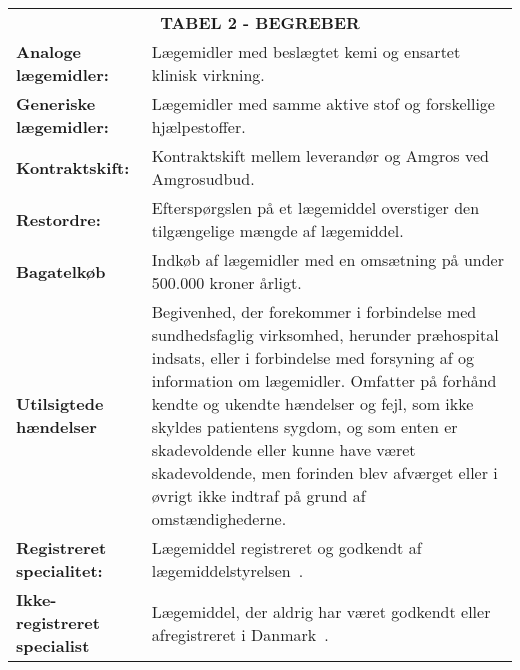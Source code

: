 \begin{table}[H]
\label{table:begreber}
\begin{tabular}{p{4.5cm} p{9.8cm}}
\multicolumn{2}{c}{\cellcolor[HTML]{C0C0C0}\textbf{TABEL 2 - BEGREBER}} \vspace{0.5cm}\\
\textbf{Analoge lægemidler:} & Lægemidler med beslægtet kemi og ensartet klinisk virkning. \vspace{0.5cm} \\
\textbf{Generiske lægemidler:} & Lægemidler med samme aktive stof og forskellige hjælpestoffer.\vspace{0.5cm} \\
\textbf{Kontraktskift:} & Kontraktskift mellem leverandør og Amgros ved Amgrosudbud.  \vspace{0.5cm} \\
\textbf{Restordre:} & Efterspørgslen på et lægemiddel overstiger den tilgængelige mængde af lægemiddel.  \vspace{0.5cm} \\
\textbf{Bagatelkøb} & Indkøb af lægemidler med en omsætning på under 500.000 kroner årligt. \vspace{0.5cm} \\
\textbf{Utilsigtede hændelser} &  Begivenhed, der forekommer i forbindelse med sundhedsfaglig virksomhed, herunder præhospital indsats, eller i forbindelse med forsyning af og information om lægemidler. Omfatter på forhånd kendte og ukendte hændelser og fejl, som ikke skyldes patientens sygdom, og som enten er skadevoldende eller kunne have været skadevoldende, men forinden blev afværget eller i øvrigt ikke indtraf på grund af omstændighederne. %
 \vspace{0.5cm} \\
\textbf{Registreret specialitet:} & Lægemiddel registreret og godkendt af lægemiddelstyrelsen~\citep{Laegemiddelinformaion2017}. \vspace{0.5cm} \\
\textbf{Ikke-registreret specialist} & Lægemiddel, der aldrig har været godkendt eller afregistreret i Danmark~\citep{Laegemiddelinformaion2017}. \vspace{0.5cm} \\

\end{tabular}
\end{table}
